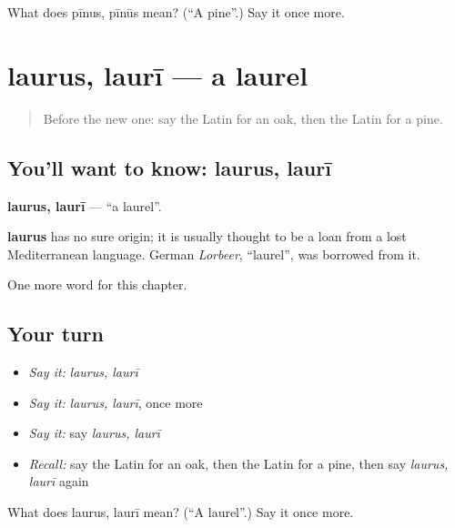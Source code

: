 \begin{tcolorbox}[breakable,colback=teal!4,colframe=teal!35!black,title={Before you move on}]
What does pīnus, pīnūs mean? (\textquotedblleft{}A pine\textquotedblright{}.) Say it once more.
\end{tcolorbox}
\section[laurus, laurī]{laurus, laurī — a laurel}

\label{lesson:LA-C250-laurus}



\begin{quote}
Before the new one: say the Latin for an oak, then the Latin for a pine.
\end{quote}

\subsection*{You'll want to know: laurus, laurī}
\textbf{laurus, laurī} — \textquotedblleft{}a laurel\textquotedblright{}.

\begin{cousinweb}
\textbf{laurus} has no sure origin; it is usually thought to be a loan from a lost Mediterranean language. German \emph{Lorbeer}, \textquotedblleft{}laurel\textquotedblright{}, was borrowed from it.
\end{cousinweb}

\begin{grammarlens}[title={What you've built}]
One more word for this chapter.
\end{grammarlens}

\subsection*{Your turn}
\begin{itemize}
\raggedright
  \item \emph{Say it:} \emph{laurus, laurī}
  \item \emph{Say it:} \emph{laurus, laurī}, once more
  \item \emph{Say it:} say \emph{laurus, laurī}
  \item \emph{Recall:} say the Latin for an oak, then the Latin for a pine, then say \emph{laurus, laurī} again
\end{itemize}

\begin{tcolorbox}[breakable,colback=teal!4,colframe=teal!35!black,title={Before you move on}]
What does laurus, laurī mean? (\textquotedblleft{}A laurel\textquotedblright{}.) Say it once more.
\end{tcolorbox}
